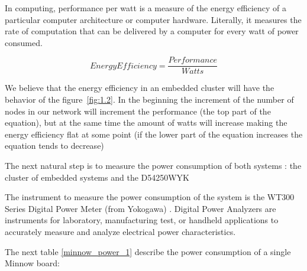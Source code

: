 In computing, performance per watt is a measure of the energy efficiency of a
particular computer architecture or computer hardware. Literally, it measures
the rate of computation that can be delivered by a computer for every watt of
power consumed.

\begin{equation}
    Energy Efficiency = \dfrac {Performance}{Watts}
\end{equation}

We believe that the energy efficiency in an embedded cluster will have the
behavior of the  figure~\ref{fig:1.2}. In the beginning the increment of the
number of nodes in our network will increment the performance (the top part of
the equation), but at the same time the amount of watts will
increase making the energy efficiency flat at some point (if the lower part of
the equation increases the equation tends to decrease)

The next natural step is to measure the power consumption of both systems : the
cluster of embedded systems and the D54250WYK

The instrument to measure the power consumption of the system is the WT300
Series Digital Power Meter (from Yokogawa) . Digital Power Analyzers are
instruments for laboratory, manufacturing test, or handheld applications to
accurately measure and analyze electrical power characteristics.

The next table \ref{minnow_power_1} describe the power consumption of a single Minnow board: 

\begin{table}[]
    \centering
    \label{minnow_power_1}
\end{table}


